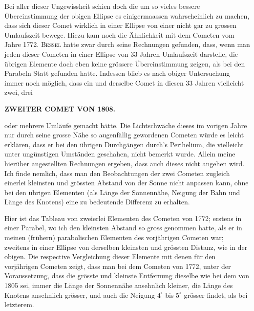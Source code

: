 \par\indent Bei aller dieser Ungewissheit schien doch die um so vieles bessere
Übereinstimmung der obigen Ellipse es einigermaassen wahrscheinlich zu
machen, dass sich dieser Comet wirklich in einer Ellipse von einer nicht gar
zu grossen Umlaufszeit bewege. Hiezu kam noch die Ähnlichkeit mit dem Cometen
vom Jahre 1772. \textsc{Bessel} hatte zwar durch seine Rechnungen gefunden,
dass, wenn man jeden dieser Cometen in einer Ellipse von 33 Jahren
Umlaufszeit darstelle, die übrigen Elemente doch eben keine grössere
Übereinstimmung zeigen, als bei den Parabeln Statt gefunden hatte. Indessen
blieb es nach obiger Untersuchung immer noch möglich, dass ein und derselbe
Comet in diesen 33 Jahren vielleicht zwei, drei
\par{}
\clearpage
\endgroup
\clearpage
\begingroup
\pagestyle{empty}
\thispagestyle{empty}
\noindent{}%
%
\parbox[t]{\dimexpr\linewidth-24mm\relax}{\centering\footnotesize\bfseries ZWEITER COMET VON 1808.\par}%
\makebox[12mm][r]{}\par\nobreak\medskip
\noindent oder mehrere Umläufe gemacht hätte. Die Lichtschwäche dieses im vorigen Jahre nur durch seine grosse
Nähe so augenfällig gewordenen Cometen würde es leicht erklären, dass er bei den übrigen Durchgängen
durch's Perihelium, die vielleicht unter ungünstigen Umständen geschahen, nicht bemerkt wurde.
Allein meine hierüber angestellten Rechnungen ergeben, dass auch dieses nicht angehen wird. Ich finde
nemlich, dass man den Beobachtungen der zwei Cometen zugleich einerlei kleinsten und grössten Abstand
von der Sonne nicht anpassen kann, ohne bei den übrigen Elementen (als Länge der Sonnennähe,
Neigung der Bahn und Länge des Knotens) eine zu bedeutende Differenz zu erhalten.

\par\indent Hier ist das Tableau von zweierlei Elementen des Cometen von 1772; erstens in einer Parabel,
wo ich den kleinsten Abstand so gross genommen hatte, als er in meinen (frühern) parabolischen Elementen
des vorjährigen Cometen war; zweitens in einer Ellipse von derselben kleinsten und grössten
Distanz, wie in der obigen. Die respective Vergleichung dieser Elemente mit denen für den vorjährigen
Cometen zeigt, dass man bei dem Cometen von 1772, unter der Voraussetzung, dass die grösste und
kleinste Entfernung dieselbe wie bei dem von 1805 sei, immer die Länge der Sonnennähe ansehnlich
kleiner, die Länge des Knotens ansehnlich grösser, und auch die Neigung $4^\circ$ bis $5^\circ$ grösser findet, als
bei letzterem.

